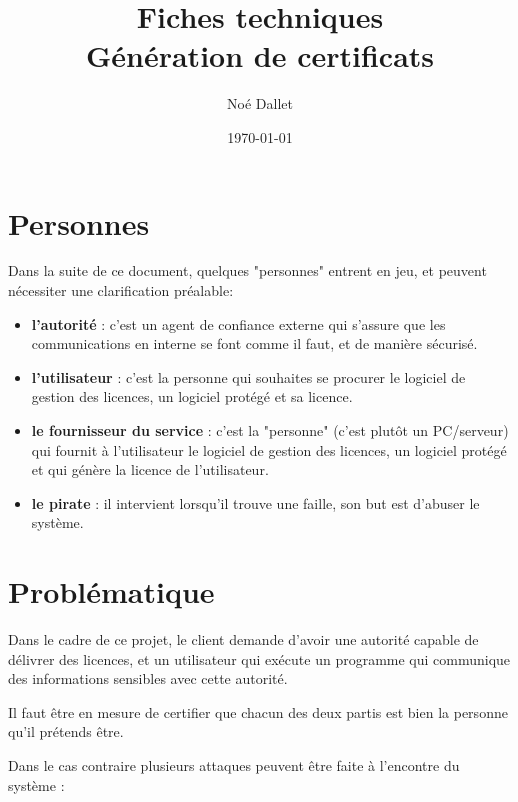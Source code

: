 \documentclass{article}
\title{
    \Huge
    Fiches techniques\\
    Génération de certificats
}
\author{\huge Noé Dallet}
\date{\huge \today}
\begin{document}
\maketitle
\newpage

\section{Personnes}

Dans la suite de ce document, quelques "personnes" entrent en jeu, et peuvent nécessiter une clarification préalable:

\begin{itemize}
    \item \textbf{l'autorité} : c'est un agent de confiance externe qui s'assure que les communications en interne se font comme il faut, et de manière sécurisé.
    \item \textbf{l'utilisateur} : c'est la personne qui souhaites se procurer le logiciel de gestion des licences, un logiciel protégé et sa licence. 
    \item \textbf{le fournisseur du service} : c'est la "personne" (c'est plutôt un PC/serveur) qui fournit à l'utilisateur le logiciel de gestion des licences, un logiciel protégé et qui génère la licence de l'utilisateur.
    \item \textbf{le pirate} : il intervient lorsqu'il trouve une faille, son but est d'abuser le système.
\end{itemize}


\section{Problématique}

Dans le cadre de ce projet, le client demande d'avoir une autorité capable de délivrer des licences, et un utilisateur qui exécute un programme qui communique des informations sensibles avec cette autorité.

Il faut être en mesure de certifier que chacun des deux partis est bien la personne qu'il prétends être.

Dans le cas contraire plusieurs attaques peuvent être faite à l'encontre du système :
\end{document}
